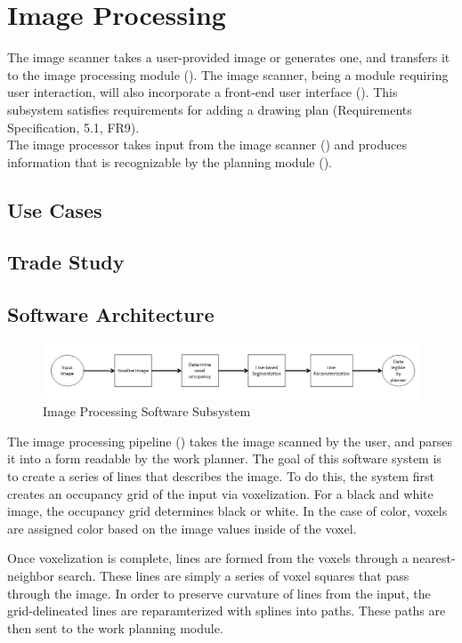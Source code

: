 
\section{Image Processing}
\label{sec:image_processing}

The image scanner takes a user-provided image or generates one, and transfers it to the image processing module (). The image scanner, being a module requiring user interaction, will also incorporate a front-end user interface (). This subsystem satisfies requirements for adding a drawing plan (Requirements Specification, 5.1, FR9). \\

The image processor takes input from the image scanner () and produces information that is recognizable by the planning module (). \\

\subsection{Use Cases}

\subsection{Trade Study}

\subsection{Software Architecture}
\label{sec:sw_arch_image_processing}

\begin{figure}[h!]
 \centering
  \includegraphics[width=0.99\columnwidth]{diagrams/sw_arch_image_processing.jpg}
	\caption{Image Processing Software Subsystem}
 \label{fig:image_processing}
\end{figure}

The image processing pipeline () takes the image scanned by the user, and parses it into a form readable by the work planner. The goal of this software system is to create a series of lines that describes the image. To do this, the system first creates an occupancy grid of the input via voxelization. For a black and white image, the occupancy grid determines black or white. In the case of color, voxels are assigned color based on the image values inside of the voxel.

Once voxelization is complete, lines are formed from the voxels through a nearest-neighbor search. These lines are simply a series of voxel squares that pass through the image. In order to preserve curvature of lines from the input, the grid-delineated lines are reparamterized with splines into paths. These paths are then sent to the work planning module.
